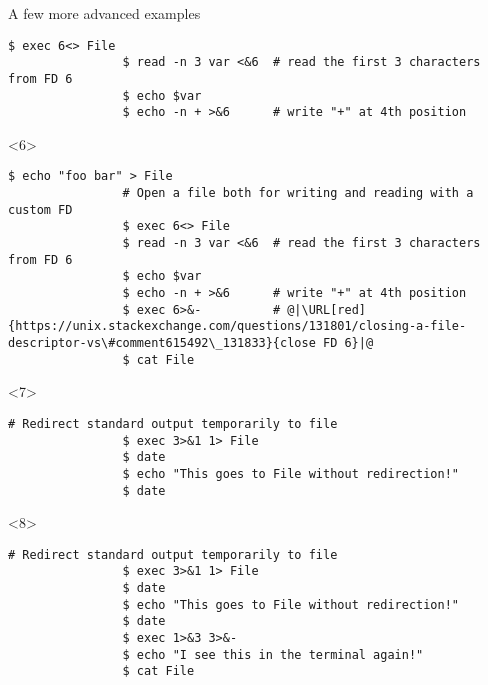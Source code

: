 \begin{frame}[fragile]{A few more advanced examples}
\begin{overlayarea}{\textwidth}{0.33\textheight}
\begin{onlyenv}
\begin{lstlisting}[style=MyBash, numbers=none, xrightmargin=3mm]
                $ exec 6<> File
                $ read -n 3 var <&6  # read the first 3 characters from FD 6
                $ echo $var
                $ echo -n + >&6      # write "+" at 4th position
            \end{lstlisting}
        \end{onlyenv}
        \begin{onlyenv}<6>
            \begin{lstlisting}[style=MyBash, numbers=none, xrightmargin=3mm]
                $ echo "foo bar" > File
                # Open a file both for writing and reading with a custom FD
                $ exec 6<> File
                $ read -n 3 var <&6  # read the first 3 characters from FD 6
                $ echo $var
                $ echo -n + >&6      # write "+" at 4th position
                $ exec 6>&-          # @|\URL[red]{https://unix.stackexchange.com/questions/131801/closing-a-file-descriptor-vs\#comment615492\_131833}{close FD 6}|@
                $ cat File
            \end{lstlisting}
        \end{onlyenv}
        \begin{onlyenv}<7>
            \begin{lstlisting}[style=MyBash, numbers=none, xrightmargin=3mm]
                # Redirect standard output temporarily to file
                $ exec 3>&1 1> File
                $ date
                $ echo "This goes to File without redirection!"
                $ date
            \end{lstlisting}
        \end{onlyenv}
        \begin{onlyenv}<8>
            \begin{lstlisting}[style=MyBash, numbers=none, xrightmargin=3mm]
                # Redirect standard output temporarily to file
                $ exec 3>&1 1> File
                $ date
                $ echo "This goes to File without redirection!"
                $ date
                $ exec 1>&3 3>&-
                $ echo "I see this in the terminal again!"
                $ cat File
            \end{lstlisting}
        \end{onlyenv}
    \end{overlayarea}
    \vspace{1mm}
    \begin{center}
\end{center}
\end{frame}
